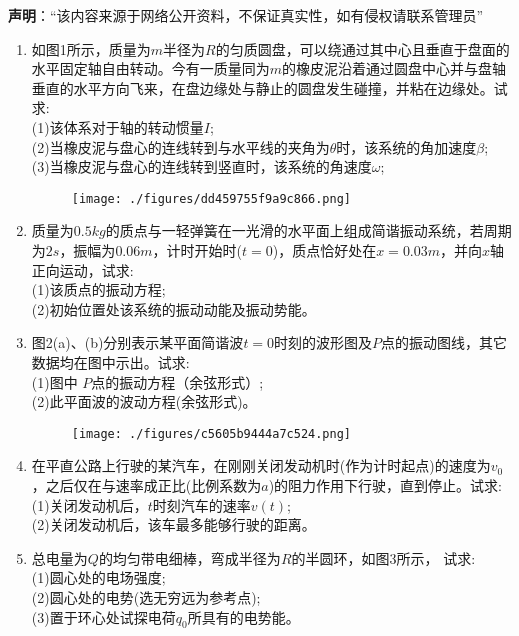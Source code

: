 
\textbf{声明}：“该内容来源于网络公开资料，不保证真实性，如有侵权请联系管理员”
\begin{enumerate}
\item 如图1所示，质量为$m$半径为$R$的匀质圆盘，可以绕通过其中心且垂直于盘面的水平固定轴自由转动。今有一质量同为$m$的橡皮泥沿着通过圆盘中心并与盘轴垂直的水平方向飞来，在盘边缘处与静止的圆盘发生碰撞，并粘在边缘处。试求:\\
(1)该体系对于轴的转动惯量$I$;\\
(2)当橡皮泥与盘心的连线转到与水平线的夹角为$\theta$时，该系统的角加速度$\beta$;\\
(3)当橡皮泥与盘心的连线转到竖直时，该系统的角速度$\omega$;
\begin{figure}[ht]
\centering
\texttt{[image: ./figures/dd459755f9a9c866.png]}
\caption{} \label{fig_SD15_3}
\end{figure}
\item 质量为$0.5kg$的质点与一轻弹簧在一光滑的水平面上组成简谐振动系统，若周期为$2s$，振幅为$0.06m$，计时开始时($t=0$)，质点恰好处在$x=0.03m$，并向$x$轴正向运动，试求:\\
(1)该质点的振动方程;\\
(2)初始位置处该系统的振动动能及振动势能。
\item 图2(a)、(b)分别表示某平面简谐波$t=0$时刻的波形图及$ P$点的振动图线，其它数据均在图中示出。试求:\\
(1)图中 $P$点的振动方程（余弦形式）;\\
(2)此平面波的波动方程(余弦形式)。
\begin{figure}[ht]
\centering
\texttt{[image: ./figures/c5605b9444a7c524.png]}
\caption{} \label{fig_SD15_2}
\end{figure}
\item 在平直公路上行驶的某汽车，在刚刚关闭发动机时(作为计时起点)的速度为$ v_0$，之后仅在与速率成正比(比例系数为$a$)的阻力作用下行驶，直到停止。试求:\\
(1)关闭发动机后，$t$时刻汽车的速率$v(t)$;\\
(2)关闭发动机后，该车最多能够行驶的距离。
\item 总电量为$Q$的均匀带电细棒，弯成半径为$R$的半圆环，如图3所示，
试求:\\
(1)圆心处的电场强度;\\
(2)圆心处的电势(选无穷远为参考点);\\
(3)置于环心处试探电荷$q_0$所具有的电势能。

\end{enumerate}
